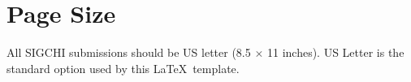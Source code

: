 \section{Page Size}
All SIGCHI submissions should be US letter (8.5 $\times$ 11
inches). US Letter is the standard option used by this \LaTeX\
template.

